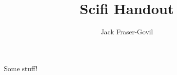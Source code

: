 \documentclass[theme=scifi]{rpghandout}
\title{Scifi Handout}
\author{Jack Fraser-Govil}
\begin{document}
    \maketitle{}

    Some stuff!
\end{document}
